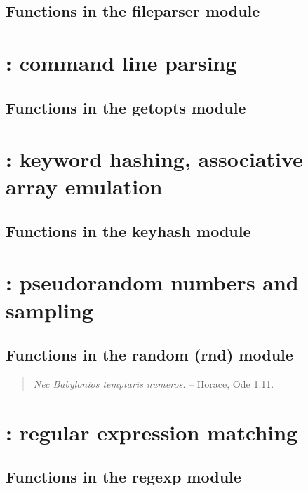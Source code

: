 \documentclass[10pt]{book}
\begin{document}
\subsection{Functions in the fileparser module}


\newpage
\section{: command line parsing}

\subsection{Functions in the getopts module}


\newpage
\section{: keyword hashing, associative array emulation}

\subsection{Functions in the keyhash module}


\newpage
\section{: pseudorandom numbers and sampling}

\subsection{Functions in the random (rnd) module}

\vspace*{\fill}

\begin{quote}
\emph{Nec Babylonios temptaris numeros.} \hspace{3em} -- Horace, Ode
1.11. \\ 
\end{quote}     

\newpage
\section{: regular expression matching}

\subsection{Functions in the regexp module}

\end{document}
